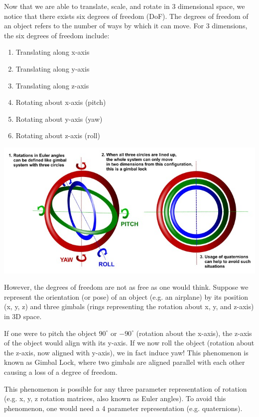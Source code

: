 \documentclass[12pt,letterpaper]{article}
\begin{document}
Now that we are able to translate, scale, and rotate in 3 dimensional space, we notice that there exists six degrees of freedom (DoF). The degrees of freedom of an object refers to the number of ways by which it can move. For 3 dimensions, the six degrees of freedom include:

\begin{enumerate}
    \item Translating along x-axis
    \item Translating along y-axis
    \item Translating along z-axis
    \item Rotating about x-axis (pitch)
    \item Rotating about y-axis (yaw)
    \item Rotating about z-axis (roll)
\end{enumerate}

\begin{center}
\includegraphics[scale=0.5]{gimballock}
\end{center}

However, the degrees of freedom are not as free as one would think. Suppose we represent the orientation (or pose) of an object (e.g. an airplane) by its position (x, y, z) and three gimbals (rings representing the rotation about x, y, and z-axis) in 3D space.

If one were to pitch the object $90^\circ$ or $-90^\circ$ (rotation about the x-axis), the z-axis of the object would align with its y-axis. If we now roll the object (rotation about the z-axis, now aligned with y-axis), we in fact induce yaw! This phenomenon is known as Gimbal Lock, where two gimbals are aligned parallel with each other causing a loss of a degree of freedom.

This phenomenon is possible for any three parameter representation of rotation (e.g. x, y, z rotation matrices, also known as Euler angles). To avoid this phenomenon, one would need a 4 parameter representation (e.g. quaternions).
\end{document}
